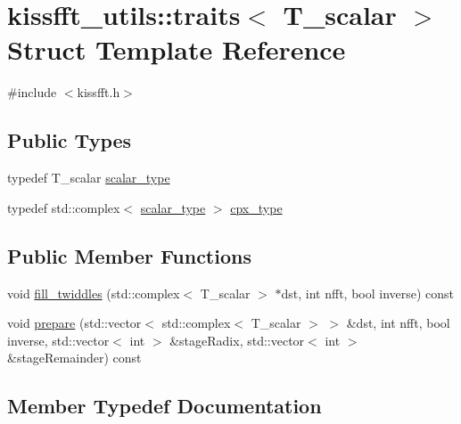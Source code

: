 \hypertarget{structkissfft__utils_1_1traits}{}\section{kissfft\+\_\+utils\+:\+:traits$<$ T\+\_\+scalar $>$ Struct Template Reference}
\label{structkissfft__utils_1_1traits}


{\ttfamily \#include $<$kissfft.\+h$>$}

\subsection*{Public Types}
\begin{DoxyCompactItemize}
\item 
typedef T\+\_\+scalar \hyperlink{structkissfft__utils_1_1traits_ac60e3850ace9adc525d8f4008f13a190}{scalar\+\_\+type}
\item 
typedef std\+::complex$<$ \hyperlink{structkissfft__utils_1_1traits_ac60e3850ace9adc525d8f4008f13a190}{scalar\+\_\+type} $>$ \hyperlink{structkissfft__utils_1_1traits_aa5947bb96077231ba1f1870b1c947034}{cpx\+\_\+type}
\end{DoxyCompactItemize}
\subsection*{Public Member Functions}
\begin{DoxyCompactItemize}
\item 
void \hyperlink{structkissfft__utils_1_1traits_a963aa6e0faf253b4db8cf348e1853c0c}{fill\+\_\+twiddles} (std\+::complex$<$ T\+\_\+scalar $>$ $\ast$dst, int nfft, bool inverse) const 
\item 
void \hyperlink{structkissfft__utils_1_1traits_aba3bcc9f5ad48851acc458711852d74c}{prepare} (std\+::vector$<$ std\+::complex$<$ T\+\_\+scalar $>$ $>$ \&dst, int nfft, bool inverse, std\+::vector$<$ int $>$ \&stage\+Radix, std\+::vector$<$ int $>$ \&stage\+Remainder) const 
\end{DoxyCompactItemize}


\subsection{Member Typedef Documentation}
